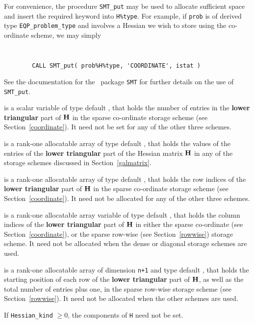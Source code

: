 \documentclass{galahad}
\newcommand{\packagename}{EQP}
\begin{document}
\begin{description}
\begin{description}
For convenience, the procedure {\tt SMT\_put} 
may be used to allocate sufficient space and insert the required keyword
into {\tt H\%type}.
For example, if {\tt prob} is of derived type {\tt \packagename\_problem\_type}
and involves a Hessian we wish to store using the co-ordinate scheme,
we may simply
{\tt 
\begin{verbatim}
        CALL SMT_put( prob%H%type, 'COORDINATE', istat )
\end{verbatim}
}
\noindent
See the documentation for the \galahad\ package {\tt SMT} 
for further details on the use of {\tt SMT\_put}.

 is a scalar variable of type default \integer, that 
holds the number of entries in the {\bf lower triangular} part of ${\mathbf{H}}$
in the sparse co-ordinate storage scheme (see Section~\ref{coordinate}). 
It need not be set for any of the other three schemes.

 is a rank-one allocatable array of type default \realdp, that holds
the values of the entries of the {\bf lower triangular} part
of the Hessian matrix ${\mathbf{H}}$ in any of the 
storage schemes discussed in Section~\ref{galmatrix}.

 is a rank-one allocatable array of type default \integer,
that holds the row indices of the {\bf lower triangular} part of ${\mathbf{H}}$ 
in the sparse co-ordinate storage
scheme (see Section~\ref{coordinate}). 
It need not be allocated for any of the other three schemes.

 is a rank-one allocatable array variable of type default \integer,
that holds the column indices of the {\bf lower triangular} part of 
${\mathbf{H}}$ in either the sparse co-ordinate 
(see Section~\ref{coordinate}), or the sparse row-wise 
(see Section~\ref{rowwise}) storage scheme.
It need not be allocated when the dense or diagonal storage schemes are used.

 is a rank-one allocatable array of dimension {\tt n+1} and type 
default \integer, that holds the starting position of 
each row of the {\bf lower triangular} part of ${\mathbf{H}}$, as well
as the total number of entries plus one, in the sparse row-wise storage
scheme (see Section~\ref{rowwise}). It need not be allocated when the
other schemes are used.

\end{description}
If {\tt Hessian\_kind} $\geq 0$, the components of {\tt H} need not be set.


\end{description}
\end{document}
